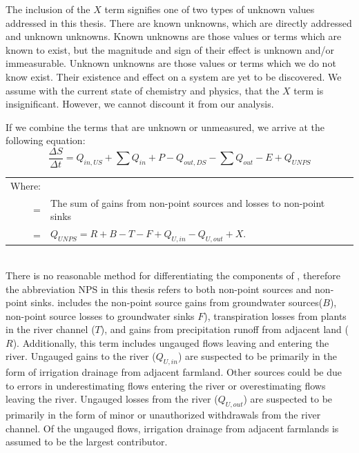 \begin{linenumbers}
The inclusion of the $ X $ term signifies one of two types of unknown values addressed in this thesis.  There are known unknowns, which are directly addressed and unknown unknowns.  Known unknowns are those values or terms which are known to exist, but the magnitude and sign of their effect is unknown and/or immeasurable.  Unknown  unknowns are those values or terms which we do not know exist.  Their existence and effect on a system are yet to be discovered.  We assume with the current state of chemistry and physics, that the $ X $ term is insignificant.  However, we cannot discount it from our analysis.

If we combine the terms that are unknown or unmeasured, we arrive at the following equation:
\begin{equation}
	\label{eq:water01}
	\frac{\Delta S}{\Delta t} = Q_{in,US} + \sum Q_{in} + P - Q_{out,DS} - \sum Q_{out} - E + Q_{UNPS}
\end{equation}
\begin{tabular}{r p{5.5in}}
	Where: \\
	\Qnps = & The sum of gains from non-point sources and losses to non-point sinks \\
		= &$ Q_{UNPS} = R + B - T - F + Q_{U,in} - Q_{U,out} +X $.\\ 
\end{tabular}\\

There is no reasonable method for differentiating the components of \Qnps, therefore the abbreviation NPS in this thesis refers to both non-point sources and non-point sinks.   \Qnps includes the non-point source gains from groundwater sources($ B $), non-point source losses to groundwater sinks {}$ F $), transpiration losses from plants in the river channel ($ T $), and gains from precipitation runoff from adjacent land ($ R $).  Additionally, this term includes ungauged flows leaving and entering the river.  Ungauged gains to the river ($ Q_{U,in} $) are suspected to be primarily in the form of irrigation drainage from adjacent farmland.  Other sources could be due to errors in underestimating flows entering the river or overestimating flows leaving the river.  Ungauged losses from the river ($ Q_{U,out} $) are suspected to be primarily in the form of minor or unauthorized withdrawals from the river channel.  Of the ungauged flows, irrigation drainage from adjacent farmlands is assumed to be the largest contributor.


\end{linenumbers}
